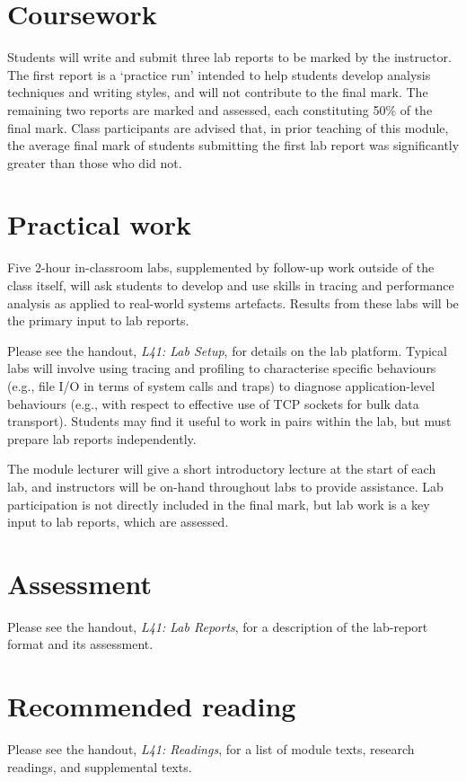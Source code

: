 \documentclass[a4paper,10pt]{article}
\begin{document}
\section{Coursework}

Students will write and submit three lab reports to be marked by the
instructor.
The first report is a `practice run' intended to help students develop 
analysis techniques and writing styles, and will not contribute to the final
mark.
The remaining two reports are marked and assessed, each constituting 50\% of
the final mark.
Class participants are advised that, in prior teaching of this module, the
average final mark of students submitting the first lab report was
significantly greater than those who did not.

\section{Practical work}

Five 2-hour in-classroom labs, supplemented by follow-up work outside of the
class itself, will ask students to develop and use skills in tracing and 
performance analysis as applied to real-world systems artefacts.
Results from these labs will be the primary input to lab reports.

Please see the handout, \textit{L41: Lab Setup}, for details on the lab
platform.
Typical labs will involve using tracing and profiling to characterise specific
behaviours (e.g., file I/O in terms of system calls and traps) to diagnose
application-level behaviours (e.g., with respect to effective use of TCP
sockets for bulk data transport).
Students may find it useful to work in pairs within the lab, but must prepare
lab reports independently.

The module lecturer will give a short introductory lecture at the start of
each lab, and instructors will be on-hand throughout labs to provide
assistance.
Lab participation is not directly included in the final mark, but lab work is
a key input to lab reports, which are assessed.

\section{Assessment}

Please see the handout, \textit{L41: Lab Reports}, for a description of the
lab-report format and its assessment.

\section{Recommended reading}

Please see the handout, \textit{L41: Readings}, for a list of module texts,
research readings, and supplemental texts.
\end{document}
